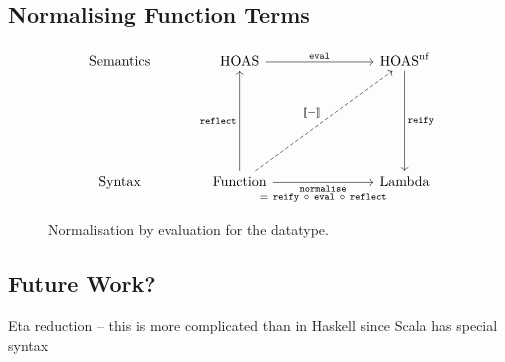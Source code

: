 \documentclass[../../main.tex]{subfiles}
\begin{document}
\subsection{Normalising Function Terms}
\begin{figure}[htbp]
\begin{equation*}
\begin{tikzcd}[row sep=huge,column sep=large]
  \text{Semantics} & \text{HOAS} \arrow[rr, "\texttt{eval}"]                                                                                                                                         &  & \text{HOAS}^\text{nf} \arrow[dd, "\texttt{reify}"] \\
                   &                                                                                                                                                                                 &  &                                                    \\
  \text{Syntax}    & \text{Function} \arrow[uu, "\texttt{reflect}"] \arrow[rr, "\substack{\texttt{normalise} \\ =\ \texttt{reify}\ \circ\ \texttt{eval}\ \circ\ \texttt{reflect}}"'] \arrow[rruu, "{\text{\textlbrackdbl} - \text{\textrbrackdbl}}", dashed] &  & \text{Lambda}                                     
\end{tikzcd}
\end{equation*}
\caption{Normalisation by evaluation for the  datatype.}
\end{figure}

\subsection{Future Work?}
Eta reduction -- this is more complicated than in Haskell since Scala has special syntax %
\end{document}
